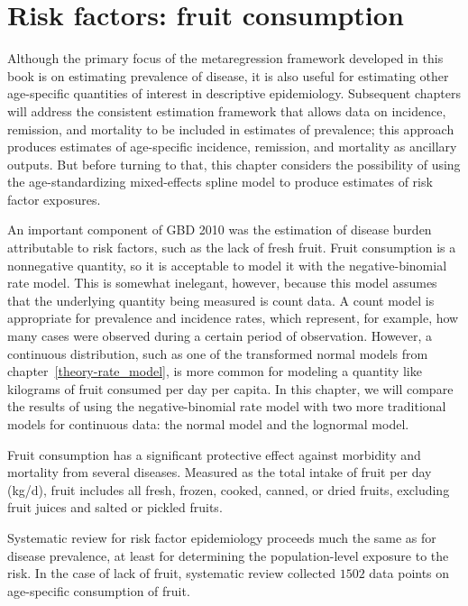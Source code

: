 \chapter{Risk factors: fruit consumption}
\label{applications-log_normal}
Although the primary focus of the metaregression framework developed
in this book is on estimating prevalence of disease, it is also
useful for estimating other age-specific quantities of interest in
descriptive epidemiology.  Subsequent chapters will address the
consistent estimation framework that allows data on incidence,
remission, and mortality to be included in estimates of prevalence;
this approach produces estimates of age-specific incidence, remission,
and mortality as ancillary outputs.  But before turning to that,
this chapter considers the possibility of using the
age-standardizing mixed-effects spline model to produce estimates of
risk factor exposures.

An important component of GBD 2010 was the estimation of
disease burden attributable to risk factors, such as the lack of fresh
fruit.  Fruit consumption is a nonnegative quantity, so it is
acceptable to model it with the negative-binomial rate model.  This is
somewhat inelegant, however, because this model assumes that the
underlying quantity being measured is count data.  A count model is
appropriate for prevalence and incidence rates, which represent, for
example, how many cases were observed during a certain period of
observation.  However, a continuous distribution, such as one of the
transformed normal models from chapter~\ref{theory-rate_model}, is
more common for modeling a quantity like kilograms of fruit consumed
per day per capita.  In this chapter, we will compare the results of
using the negative-binomial rate model with two more traditional
models for continuous data: the normal model and the lognormal model.

Fruit consumption has a significant protective
effect against morbidity and mortality from several diseases.
Measured as the total intake of fruit per day (kg/d), fruit
includes all fresh, frozen, cooked, canned, or dried fruits, excluding
fruit juices and salted or pickled fruits. \cite{he_increased_2007,
  boeing_intake_2006}

Systematic review for
risk factor epidemiology proceeds much the same as for disease
prevalence, at least for determining the population-level exposure to
the risk.  In the case of lack of fruit, systematic review collected
$1502$ data points on age-specific consumption of fruit.

